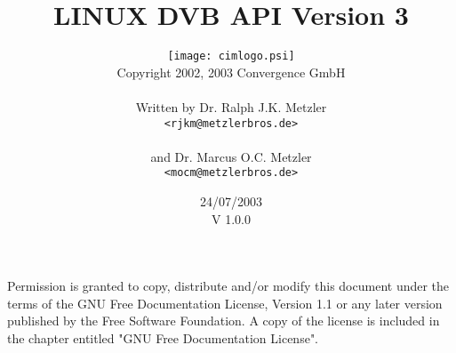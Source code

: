 \pagestyle{empty}
\title{\huge\textbf{LINUX DVB API Version 3}}

\author{
\texttt{[image: cimlogo.psi]}\\
  Copyright 2002, 2003 Convergence GmbH\\\\
  Written by Dr. Ralph J.K. Metzler\\
  \texttt{<rjkm@metzlerbros.de>}\\\\
  and Dr. Marcus O.C. Metzler\\
  \texttt{<mocm@metzlerbros.de>}\\
}
\date{24/07/2003\\V 1.0.0}

\maketitle

Permission is granted to copy, distribute and/or modify this document
under the terms of the GNU Free Documentation License, Version 1.1
or any later version published by the Free Software Foundation.
A copy of the license is included in the chapter entitled "GNU
Free Documentation License".

\newpage


